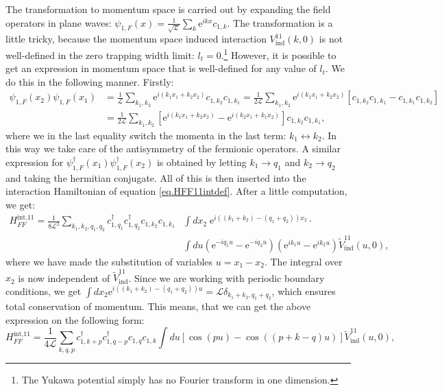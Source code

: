 The transformation to momentum space is carried out by expanding the field operators in plane waves: $\psi_{1,F}(x) = \frac{1}{\sqrt{\mathcal{L}}}\sum_k \text{e}^{ikx} c_{1,k}$. The transformation is a little tricky, because the momentum space induced interaction $V^{11}_{\text{ind}}(k, 0)$ is not well-defined in the zero trapping width limit: $l_t = 0$.\footnote{The Yukawa potential simply has no Fourier transform in one dimension.} However, it is possible to get an expression in momentum space that is well-defined for any value of $l_t$. We do this in the following manner. Firstly:
\begin{align}
\psi_{1,F}(x_2) \psi_{1,F}(x_1) &= \frac{1}{\mathcal{L}}\sum_{k_1,k_2} \text{e}^{i(k_1x_1 + k_2x_2)} c_{1, k_2}c_{1, k_1} = \frac{1}{2\mathcal{L}}\sum_{k_1,k_2} \text{e}^{i(k_1x_1 + k_2x_2)} \left[c_{1, k_2}c_{1, k_1} - c_{1, k_1}c_{1, k_2}\right] \nonumber \\
&= \frac{1}{2\mathcal{L}}\sum_{k_1,k_2} \left[\text{e}^{i(k_1x_1 + k_2x_2)} - \text{e}^{i(k_2x_1 + k_1x_2)}\right]c_{1, k_2}c_{1, k_1}, \nonumber
\end{align}
where we in the last equality switch the momenta in the last term: $k_1 \leftrightarrow k_2$. In this way we take care of the antisymmetry of the fermionic operators. A similar expression for $\psi^\dagger_{1, F}(x_1)\psi^\dagger_{1, F}(x_2)$ is obtained by letting $k_1 \to q_1$ and $k_2 \to q_2$ and taking the hermitian conjugate. All of this is then inserted into the interaction Hamiltonian of equation \eqref{eq.HFF11intdef}. After a little computation, we get:
\begin{align}
H^\text{int,11}_{FF} = \frac{1}{8\mathcal{L}^2} \sum_{k_1,k_2,q_1,q_2} c^\dagger_{1, q_1}c^\dagger_{1, q_2}c_{1, k_2}c_{1, k_1} & \int dx_2 \; \text{e}^{i((k_1 + k_2) -(q_1 + q_2))x_2}\cdot \nonumber \\ 
&\int du\left( \text{e}^{-iq_1u} - \text{e}^{-iq_2u} \right)\left( \text{e}^{ik_1u} - \text{e}^{ik_2u} \right)\tilde{V}^{11}_\text{ind}(u, 0), \nonumber
\end{align}
where we have made the substitution of variables $u = x_1 - x_2$. The integral over $x_2$ is now independent of $\tilde{V}^{11}_{\text{ind}}$. Since we are working with periodic boundary conditions, we get $\int dx_2 \text{e}^{i((k_1 + k_2) - (q_1 + q_2))u} = \mathcal{L}\delta_{k_1 + k_2, q_1 + q_2}$, which ensures total conservation of momentum. This means, that we can get the above expression on the following form: 
\begin{equation}
H^\text{int,11}_{FF} = \frac{1}{4\mathcal{L}} \sum_{k, q, p} c^\dagger_{1, k + p}c^\dagger_{1, q - p}c_{1, q}c_{1, k} \int du\left[\cos\left(pu\right) - \cos\left(\left( p + k - q \right)u\right)\right]\tilde{V}^{11}_{\text{ind}}(u,0), \nonumber
\end{equation}
